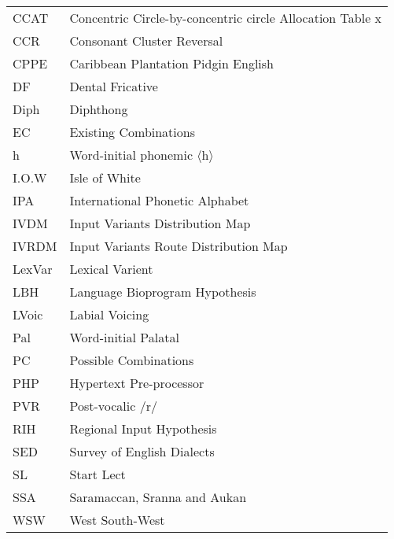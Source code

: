 \noindent\begin{tabular}{@{}lp{10cm}@{}} 
CCAT        &    Concentric Circle-by-concentric circle Allocation Table  x\\
CCR        &    Consonant Cluster Reversal \\
CPPE       &    Caribbean Plantation Pidgin English \\
DF       &    Dental Fricative \\
Diph        &    Diphthong \\
EC        &    Existing Combinations \\
h       &    Word-initial phonemic $\langle$h$\rangle$ \\
I.O.W        &    Isle of White \\

IPA        &    International Phonetic Alphabet\\
IVDM        &    Input Variants Distribution Map \\
IVRDM       &    Input Variants Route Distribution Map \\
LexVar       &    Lexical Varient \\
LBH        &    Language Bioprogram Hypothesis \\
LVoic       &    Labial Voicing \\
Pal       &    Word-initial Palatal \\
PC        &    Possible Combinations \\        
PHP        &    Hypertext Pre-processor \\
PVR       &    Post-vocalic /r/\\
RIH       &    Regional Input Hypothesis \\
SED        &    Survey of English Dialects \\
SL        &    Start Lect \\
SSA       &    Saramaccan, Sranna and Aukan \\
WSW        &    West South-West
\end{tabular}
